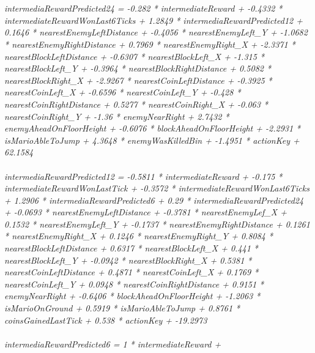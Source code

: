 \documentclass[10pt, spanish, pdftex]{../.template/template}
\begin{document}
{\\\\
\textit{intermediaRewardPredicted24 =
     -0.282  * intermediateReward +
     -0.4332 * intermediateRewardWonLast6Ticks +
      1.2849 * intermediaRewardPredicted12 +
      0.1646 * nearestEnemyLeftDistance +
     -0.4056 * nearestEnemyLeft\_Y +
     -1.0682 * nearestEnemyRightDistance +
      0.7969 * nearestEnemyRight\_X +
     -2.3371 * nearestBlockLeftDistance +
     -0.6307 * nearestBlockLeft\_X +
     -1.315  * nearestBlockLeft\_Y +
     -0.3964 * nearestBlockRightDistance +
      0.5082 * nearestBlockRight\_X +
     -2.9267 * nearestCoinLeftDistance +
     -0.3925 * nearestCoinLeft\_X +
     -0.6596 * nearestCoinLeft\_Y +
     -0.428  * nearestCoinRightDistance +
      0.5277 * nearestCoinRight\_X +
     -0.063  * nearestCoinRight\_Y +
     -1.36   * enemyNearRight +
      2.7432 * enemyAheadOnFloorHeight +
     -0.6076 * blockAheadOnFloorHeight +
     -2.2931 * isMarioAbleToJump +
      4.3648 * enemyWasKilledBin +
     -1.4951 * actionKey +
     62.1584}\\\\
     \textit{intermediaRewardPredicted12 =
     -0.5811 * intermediateReward +
     -0.175  * intermediateRewardWonLastTick +
     -0.3572 * intermediateRewardWonLast6Ticks +
      1.2906 * intermediaRewardPredicted6 +
      0.29   * intermediaRewardPredicted24 +
     -0.0693 * nearestEnemyLeftDistance +
     -0.3781 * nearestEnemyLef\_X +
      0.1532 * nearestEnemyLeft\_Y +
     -0.1737 * nearestEnemyRightDistance +
      0.1261 * nearestEnemyRight\_X +
      0.1246 * nearestEnemyRight\_Y +
      0.8084 * nearestBlockLeftDistance +
      0.6317 * nearestBlockLeft\_X +
      0.441  * nearestBlockLeft\_Y +
     -0.0942 * nearestBlockRight\_X +
      0.5381 * nearestCoinLeftDistance +
      0.4871 * nearestCoinLeft\_X +
      0.1769 * nearestCoinLeft\_Y +
      0.0948 * nearestCoinRightDistance +
      0.9151 * enemyNearRight +
     -0.6406 * blockAheadOnFloorHeight +
     -1.2063 * isMarioOnGround +
      0.5919 * isMarioAbleToJump +
      0.8761 * coinsGainedLastTick +
      0.538  * actionKey +
    -19.2973}\\\\
    \textit{intermediaRewardPredicted6 =
    1      * intermediateReward +
}}
\end{document}
